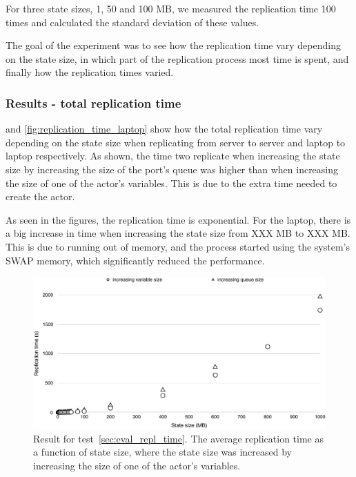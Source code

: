 \documentclass{cslthse-msc}
\begin{document}
For three state sizes, 1, 50 and 100 MB, we measured the replication time 100 times and calculated the standard deviation of these values.

The goal of the experiment was to see how the replication time vary depending on the state size, in which part of the replication process most time is spent, and finally how the replication times varied.

\subsubsection*{Results - total replication time}
 and \cref{fig:replication_time_laptop} show how the total replication time vary depending on the state size when replicating from server to server and laptop to laptop respectively. As shown, the time two replicate when increasing the state size by increasing the size of the port's queue was higher than when increasing the size of one of the actor's variables. This is due to the extra time needed to create the actor. 

As seen in the figures, the replication time is exponential. For the laptop, there is a big increase in time when increasing the state size from XXX MB to XXX MB. This is due to running out of memory, and the process started using the system's SWAP memory, which significantly reduced the performance. 

\begin{figure}[hbt!]
\centering
\includegraphics[scale=0.5]{images/results/replication_time/server.pdf} 
\caption{Result for test~\ref{sec:eval_repl_time}. The average replication time as a function of state size, where the state size was increased by increasing the size of one of the actor's variables.} \label{fig:replication_time_server}
\end{figure}
\end{document}
